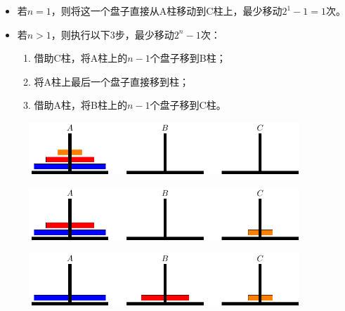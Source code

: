 \begin{frame}
  \begin{itemize}
  \item 若$n=1$，则将这一个盘子直接从A柱移动到C柱上，最少移动$2^1-1=1$次。
  \item 若$n>1$，则执行以下3步，最少移动$2^n-1$次：
    \begin{enumerate}
    \item 借助C柱，将A柱上的$n-1$个盘子移到B柱；\\[.1in]
    \item 将A柱上最后一个盘子直接移到柱；\\[.1in]
    \item 借助A柱，将B柱上的$n-1$个盘子移到C柱。
    \end{enumerate}
  \end{itemize}
\end{frame}

\begin{frame}
  \begin{figure}[htbp]
    \centering
    \includegraphics[width=4in]{ch09/images/ht0.pdf}
  \end{figure}
\end{frame}

\begin{frame}
  \begin{figure}[htbp]
    \centering
    \includegraphics[width=4in]{ch09/images/ht1.pdf}
  \end{figure}
\end{frame}

\begin{frame}
  \begin{figure}[htbp]
    \centering
    \includegraphics[width=4in]{ch09/images/ht2.pdf}
  \end{figure}
\end{frame}

